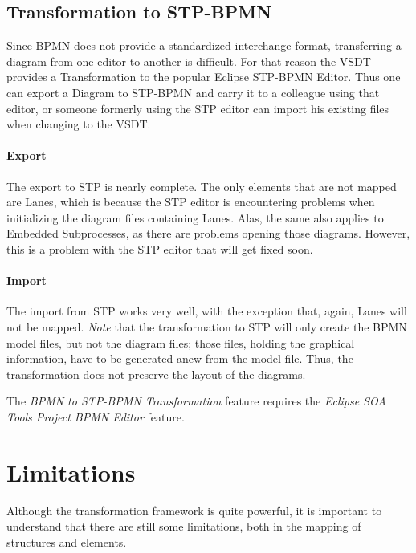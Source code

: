 \subsection{Transformation to STP-BPMN}
\label{sec:user_trafo_stp}

Since BPMN does not provide a standardized interchange format, transferring a diagram from one
editor to another is difficult. For that reason the VSDT provides a Transformation to the popular
Eclipse STP-BPMN Editor. Thus one can export a Diagram to STP-BPMN and carry it to a colleague using
that editor, or someone formerly using the STP editor can import his existing files when changing to
the VSDT.

\paragraph{Export}
The export to STP is nearly complete. The only elements that are not mapped are Lanes, which is
because the STP editor is encountering problems when initializing the diagram files containing
Lanes. Alas, the same also applies to Embedded Subprocesses, as there are problems opening those
diagrams. However, this is a problem with the STP editor that will get fixed soon.

\paragraph{Import}
The import from STP works very well, with the exception that, again, Lanes will not be mapped.
\emph{Note} that the transformation to STP will only create the BPMN model files, but not the
diagram files; those files, holding the graphical information, have to be generated anew from the
model file. Thus, the transformation does not preserve the layout of the diagrams.

The \emph{BPMN to STP-BPMN Transformation} feature requires the \emph{Eclipse SOA Tools Project BPMN
Editor} feature.


\section{Limitations}
\label{sec:user_trafo_limits}

Although the transformation framework is quite powerful, it is important to understand that there
are still some limitations, both in the mapping of structures and elements.

